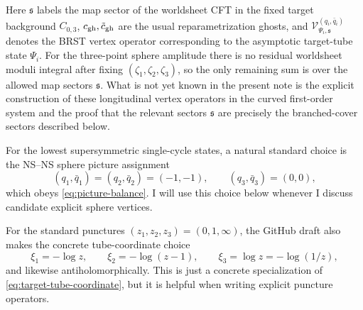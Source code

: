 \documentclass[11pt]{article}
\newcommand{\mc}[1]{\mathcal{#1}}
\begin{document}
Here $\mathfrak s$ labels the map sector of the worldsheet CFT in the fixed target background $C_{0,3}$, $c_{\rm gh},\tilde c_{\rm gh}$ are the usual reparametrization ghosts, and $\mc V_{\Psi_i,\mathfrak s}^{(q_i,\bar q_i)}$ denotes the BRST vertex operator corresponding to the asymptotic target-tube state $\Psi_i$. For the three-point sphere amplitude there is no residual worldsheet moduli integral after fixing $(\zeta_1,\zeta_2,\zeta_3)$, so the only remaining sum is over the allowed map sectors $\mathfrak s$. What is not yet known in the present note is the explicit construction of these longitudinal vertex operators in the curved first-order system and the proof that the relevant sectors $\mathfrak s$ are precisely the branched-cover sectors described below.

For the lowest supersymmetric single-cycle states, a natural standard choice is the NS--NS sphere picture assignment
\begin{equation}\label{eq:sphere-picture-choice}
(q_1,\bar q_1)=(q_2,\bar q_2)=(-1,-1),
\qquad
(q_3,\bar q_3)=(0,0),
\end{equation}
which obeys \eqref{eq:picture-balance}. I will use this choice below whenever I discuss candidate explicit sphere vertices.

For the standard punctures $(z_1,z_2,z_3)=(0,1,\infty)$, the GitHub draft also makes the concrete tube-coordinate choice
\begin{equation}\label{eq:explicit-three-tube-coordinates}
\xi_1=-\log z,
\qquad
\xi_2=-\log(z-1),
\qquad
\xi_3=\log z=-\log(1/z),
\end{equation}
and likewise antiholomorphically. This is just a concrete specialization of \eqref{eq:target-tube-coordinate}, but it is helpful when writing explicit puncture operators.
\end{document}
